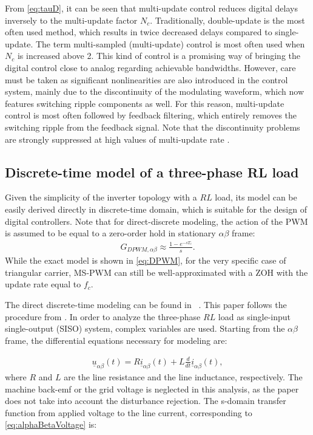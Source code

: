 \documentclass[conference]{IEEEtran}
\begin{document}
From \eqref{eq:tauD}, it can be seen that multi-update control reduces digital delays inversely to the multi-update factor $N_c$. Traditionally, double-update is the most often used method, which results in twice decreased delays compared to single-update.
The term multi-sampled (multi-update) control is most often used when $N_c$ is increased above 2. This kind of control is a promising way of bringing the digital control close to analog regarding achievable bandwidths. However, care must be taken as significant nonlinearities are also introduced in the control system, mainly due to the discontinuity of the modulating waveform, which now features switching ripple components as well. For this reason, multi-update control is most often followed by feedback filtering, which entirely removes the switching ripple from the feedback signal. Note that the discontinuity problems are strongly suppressed at high values of multi-update rate \cite{Petric2021b}.

\subsection{Discrete-time model of a three-phase RL load}

Given the simplicity of the inverter topology with a $RL$ load, its model can be easily derived directly in discrete-time domain, which is suitable for the design of digital controllers. Note that for direct-discrete modeling, the action of the PWM is assumed to be equal to a zero-order hold in stationary $\alpha \beta$ frame:
\begin{equation}
\begin{aligned}
G_{DPWM,\alpha \beta} \approx \frac{1-e^{-sT_c}}{s}.
\label{eq:DPWMAlphaBeta} 
\end{aligned}    
\end{equation}
While the exact model is shown in \eqref{eq:DPWM}, for the very specific case of triangular carrier, MS-PWM can still be well-approximated with a ZOH with the update rate equal to $f_c$.

The direct discrete-time modeling can be found in ~\cite{lorenz2010,vuksa2016,commentsHoffmann}. This paper follows the procedure from \cite{commentsHoffmann}.
In order to analyze the three-phase $RL$ load as single-input single-output (SISO) system, complex variables are used. 
Starting from the $\alpha \beta$ frame, the differential equations necessary for modeling are:

\begin{equation}
\begin{aligned}
\underline{u}_{\alpha \beta} (t) = R \underline{i}_{\alpha \beta} (t) + L \frac{d}{dt} \underline{i}_{\alpha \beta} (t),
\label{eq:alphaBetaVoltage} 
\end{aligned}    
\end{equation}
where $R$ and $L$ are the line resistance and the line inductance, respectively. The machine back-emf or the grid voltage is neglected in this analysis, as the paper does not take into account the disturbance rejection.
The s-domain transfer function from applied voltage to the line current, corresponding to \eqref{eq:alphaBetaVoltage} is:
\end{document}
